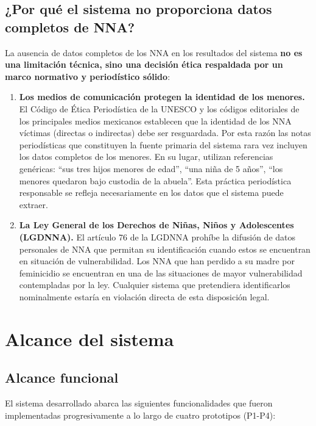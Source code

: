 \subsection{¿Por qué el sistema no proporciona datos completos de NNA?}

La ausencia de datos completos de los NNA en los resultados del sistema \textbf{no es una limitación técnica, sino una decisión ética respaldada por un marco normativo y periodístico sólido}:

\begin{enumerate}
    \item \textbf{Los medios de comunicación protegen la identidad de los menores.} El Código de Ética Periodística de la UNESCO
    y los códigos editoriales de los principales medios mexicanos establecen que la identidad de los NNA víctimas (directas o indirectas)
    debe ser resguardada. Por esta razón las notas periodísticas que constituyen la fuente primaria del sistema rara vez incluyen los
    datos completos de los menores. En su lugar, utilizan referencias genéricas: ``sus tres hijos menores de edad'',
    ``una niña de 5 años'', ``los menores quedaron bajo custodia de la abuela''. Esta práctica periodística responsable se refleja
    necesariamente en los datos que el sistema puede extraer.
    
    \item \textbf{La Ley General de los Derechos de Niñas, Niños y Adolescentes (LGDNNA).} El artículo 76 de la LGDNNA prohíbe la difusión
    de datos personales de NNA que permitan su identificación cuando estos se encuentran en situación de vulnerabilidad. Los NNA que han
    perdido a su madre por feminicidio se encuentran en una de las situaciones de mayor vulnerabilidad contempladas por la ley. Cualquier
    sistema que pretendiera identificarlos nominalmente estaría en violación directa de esta disposición legal.
\end{enumerate}

\section{Alcance del sistema}
\label{sec:alcance}

\subsection{Alcance funcional}

El sistema desarrollado abarca las siguientes funcionalidades que fueron implementadas progresivamente a lo largo de
cuatro prototipos (P1-P4):\\

